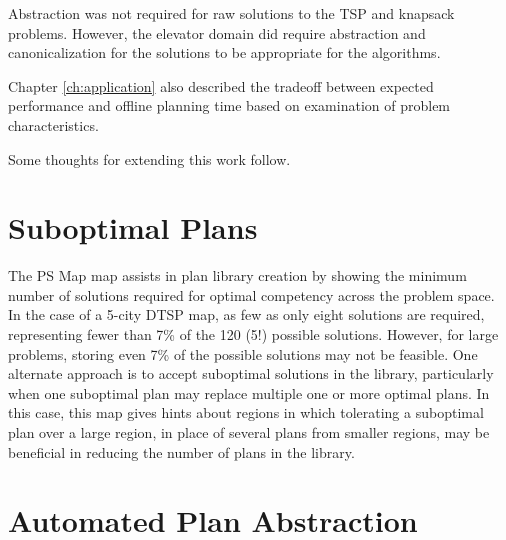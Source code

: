 Abstraction was not required for raw solutions to the TSP and knapsack problems.  However, the elevator domain did require abstraction and canonicalization for the solutions to be appropriate for the algorithms.

Chapter \ref{ch:application} also described the tradeoff between expected performance and offline planning time based on examination of problem characteristics.


Some thoughts for extending this work follow.

\section{Suboptimal Plans}

The PS Map map assists in plan library creation by showing the minimum number of solutions required for optimal competency across the problem space.  In the case of a 5-city DTSP map, as few as only eight solutions are required, representing fewer than 7\% of the 120 (5!) possible solutions.  However, for large problems, storing even 7\% of the possible solutions may not be feasible.  One alternate approach is to accept suboptimal solutions in the library, particularly when one suboptimal plan may replace multiple one or more optimal plans.  In this case, this map gives hints about regions in which tolerating a suboptimal plan over a large region, in place of several plans from smaller regions, may be beneficial in reducing the number of plans in the library.

\section{Automated Plan Abstraction}

